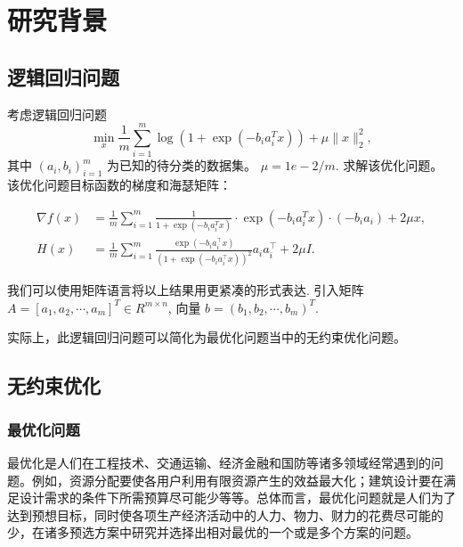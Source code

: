 
\chapter{\hei \textbf{研究背景}}

\section{\hei 逻辑回归问题}

   	考虑逻辑回归问题
$$
\min _{x} \frac{1}{m} \sum_{i=1}^{m} \log \left(1+\exp \left(-b_{i} a_{i}^{T} x\right)\right)+\mu\|x\|_{2}^{2},
$$
其中 $\left(a_{i}, b_{i}\right)_{i=1}^{m}$ 为已知的待分类的数据集。 $\mu=1 e-2 / m$. 求解该优化问题。 该优化问题目标函数的梯度和海瑟矩阵：

$$
\begin{aligned}
	\nabla f(x) &=\frac{1}{m} \sum_{i=1}^{m} \frac{1}{1+\exp \left(-b_{i} a_{i}^{T} x\right)} \cdot \exp \left(-b_{i} a_{i}^{T} x\right) \cdot\left(-b_{i} a_{i}\right)+2 \mu x, \\
	H(x) &=\frac{1}{m} \sum_{i=1}^{m} \frac{\exp \left(-b_{i} a_{i}^{\top} x\right)}{\left(1+\exp \left(-b_{i} a_{i}^{\top} x\right)\right)^{2}} a_{i} a_{i}^{\top}+2 \mu I .
\end{aligned}
$$

我们可以使用矩阵语言将以上结果用更紧凑的形式表达. 引入矩阵 $A=\left[a_{1}, a_{2}, \cdots, a_{m}\right]^{T} \in R^{m \times n}$, 向量 $b=\left(b_{1}, b_{2}, \cdots, b_{m}\right)^{T}$.

{\hei 实际上，此逻辑回归问题可以简化为最优化问题当中的无约束优化问题。}


\section{\hei 无约束优化}
\subsection{最优化问题}

最优化是人们在工程技术、交通运输、经济金融和国防等诸多领域经常遇到的问题。例如，资源分配要使各用户利用有限资源产生的效益最大化；建筑设计要在满足设计需求的条件下所需预算尽可能少等等。总体而言，最优化问题就是人们为了达到预想目标，同时使各项生产经济活动中的人力、物力、财力的花费尽可能的少，在诸多预选方案中研究并选择出相对最优的一个或是多个方案的问题。

